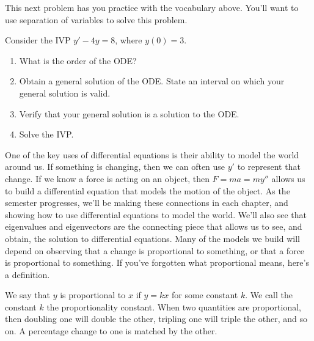 This next problem has you practice with the vocabulary above.  You'll want to use separation of variables to solve this problem.
\begin{problem}\label{ex2 in chapter 4}
Consider the IVP $y'-4y=8$, where $y(0)=3$.   
\begin{enumerate}
 \item What is the order of the ODE?
 \item Obtain a general solution of the ODE. State an interval on which your general solution is valid.
 \item Verify that your general solution is a solution to the ODE. 
 \item Solve the IVP.
\end{enumerate}
\end{problem}

One of the key uses of differential equations is their ability to model the world around us. If something is changing, then we can often use $y'$ to represent that change.  If we know a force is acting on an object, then $F=ma = my''$ allows us to build a differential equation that models the motion of the object.  As the semester progresses, we'll be making these connections in each chapter, and showing how to use differential equations to model the world.  We'll also see that eigenvalues and eigenvectors are the connecting piece that allows us to see, and obtain, the solution to differential equations. Many of the models we build will depend on observing that a change is proportional to something, or that a force is proportional to something. If you've forgotten what proportional means, here's a definition.

\begin{definition}[Proportional]
 We say that $y$ is proportional to $x$ if $y=kx$ for some constant $k$. We call the constant $k$ the proportionality constant. When two quantities are proportional, then doubling one will double the other, tripling one will triple the other, and so on. A percentage change to one is matched by the other.
\end{definition}

